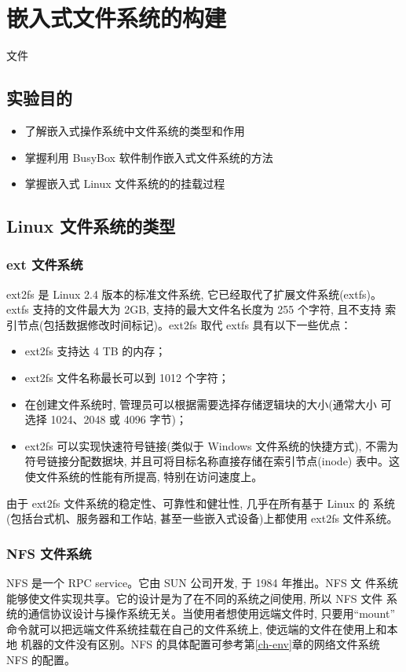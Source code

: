 \chapter{嵌入式文件系统的构建}{文件}\label{ch-fs}

\section{实验目的}
\begin{itemize}\itemsep=-3pt
  \item 了解嵌入式操作系统中文件系统的类型和作用
  \item 掌握利用 BusyBox 软件制作嵌入式文件系统的方法
  \item 掌握嵌入式 Linux 文件系统的的挂载过程
\end{itemize}

\section{Linux 文件系统的类型}
\subsection{ext 文件系统}
	ext2fs 是 Linux 2.4 版本的标准文件系统, 它已经取代了扩展文件系统(extfs)。
extfs 支持的文件最大为 2GB, 支持的最大文件名长度为 255 个字符, 且不支持
索引节点(包括数据修改时间标记)。ext2fs 取代 extfs 具有以下一些优点：
\begin{itemize}\itemsep=-3pt
  \item ext2fs 支持达 4 TB 的内存；
  \item ext2fs 文件名称最长可以到 1012 个字符；
  \item 在创建文件系统时, 管理员可以根据需要选择存储逻辑块的大小(通常大小
		可选择 1024、2048 或 4096 字节)；
  \item ext2fs 可以实现快速符号链接(类似于 Windows 文件系统的快捷方式), 
		不需为符号链接分配数据块, 并且可将目标名称直接存储在索引节点(inode)
		表中。这使文件系统的性能有所提高, 特别在访问速度上。
\end{itemize}
	由于 ext2fs 文件系统的稳定性、可靠性和健壮性, 几乎在所有基于 Linux 的
系统(包括台式机、服务器和工作站, 甚至一些嵌入式设备)上都使用 ext2fs 文件系统。

\subsection{NFS 文件系统}
	NFS 是一个 RPC service。它由 SUN 公司开发, 于 1984 年推出。NFS 文
件系统能够使文件实现共享。它的设计是为了在不同的系统之间使用, 所以 NFS 文件
系统的通信协议设计与操作系统无关。当使用者想使用远端文件时, 只要用``mount''
命令就可以把远端文件系统挂载在自己的文件系统上, 使远端的文件在使用上和本地
机器的文件没有区别。NFS 的具体配置可参考第\ref{ch-env}章的网络文件系统 NFS
的配置。

